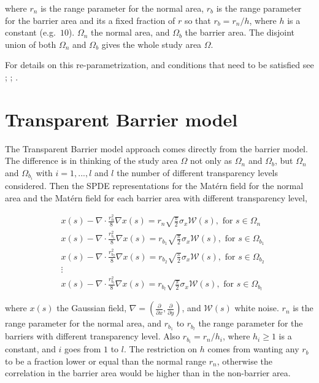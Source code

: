 \documentclass[
]{book}
\begin{document}
where \(r_n\) is the range parameter for the normal area, \(r_b\) is the range parameter for the barrier area and its a fixed fraction of \(r\) so that \(r_b=r_n/h\), where \(h\) is a constant (e.g.~\(10\)). \(\Omega_n\) the normal area, and \(\Omega_b\) the barrier area. The disjoint union of both \(\Omega_n\) and \(\Omega_b\) gives the whole study area \(\Omega\).

For details on this re-parametrization, and conditions that need to be satisfied see
\citet{lindgren_explicit_2011}; \citet{bakka_non-stationary_2019}; \citet{bakka_how_2022}.

\hypertarget{transparent-barrier-model-1}{%
\section{Transparent Barrier model}\label{transparent-barrier-model-1}}

The Transparent Barrier model approach comes directly from the barrier model. The difference is in thinking of the study area \(\Omega\) not only as \(\Omega_n\) and \(\Omega_b\), but \(\Omega_n\) and \(\Omega_{b_{i}}\) with \(i=1,...,l\) and \(l\) the number of different transparency levels considered. Then the SPDE representations for the Matérn field for the normal area and the Matérn field for each barrier area with different transparency level,

\[\begin{aligned}
& x(s)-\nabla \cdot \frac{r_n^2}{8} \nabla x(s)=r_n \sqrt{\frac{\pi}{2}} \sigma_x \mathcal{W}(s), \text { for } s \in \Omega_n \\
& x(s)-\nabla \cdot \frac{r_{b_1}^2}{8} \nabla x(s)=r_{b_1} \sqrt{\frac{\pi}{2}} \sigma_x \mathcal{W}(s), \text { for } s \in \Omega_{b_1} \\
& x(s)-\nabla \cdot \frac{r_{b_2}^2}{8} \nabla x(s)=r_{b_2} \sqrt{\frac{\pi}{2}} \sigma_x \mathcal{W}(s), \text { for } s \in \Omega_{b_2}\\
& \vdots\\
& x(s)-\nabla \cdot \frac{r_{b_l}^2}{8} \nabla x(s)=r_{b_l} \sqrt{\frac{\pi}{2}} \sigma_x \mathcal{W}(s), \text { for } s \in \Omega_{b_l}
\end{aligned}\]

where \(x(s)\) the Gaussian field, \(\nabla=\left(\frac{\partial}{\partial x}, \frac{\partial}{\partial y}\right)\), and \(\mathcal{W}(s)\) white noise. \(r_n\) is the range parameter for the normal area, and \(r_{b_1}\) to \(r_{b_l}\) the range parameter for the barriers with different transparency level. Also \(r_{b_i}=r_{n}/h_i\), where \(h_i\geq1\) is a constant, and \(i\) goes from \(1\) to \(l\). The restriction on \(h\) comes from wanting any \(r_b\) to be a fraction lower or equal than the normal range \(r_n\), otherwise the correlation in the barrier area would be higher than in the non-barrier area.
\end{document}

